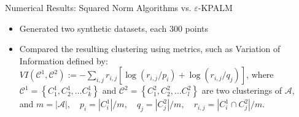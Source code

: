 \documentclass[9pt]{beamer}
\begin{document}
	\begin{frame}{Numerical Results: Squared Norm Algorithms vs. $\varepsilon$-KPALM}
		\begin{itemize}[<+->]
			\item Generated two synthetic datasets, each 300 points
			\begin{figure}
		    	\centering
			\end{figure}
			\setcounter{subfigure}{0}
			\item Compared the resulting clustering using metrics, such as {\dblue Variation of Information} defined by:
				$VI(\mathcal{C}^1,\mathcal{C}^2):=-\sum\limits_{i,j} r_{i,j}\left[ \log \left( r_{i,j}/p_i \right) + \log \left( r_{i,j}/q_j \right) \right]$, where $\mathcal{C}^1=\left\lbrace C^1_1, C^1_2, \ldots C^1_k \right\rbrace$ and $\mathcal{C}^2=\left\lbrace C^2_1, C^2_2, \ldots C^2_l \right\rbrace$ are two clusterings of $\mathcal{A}$,\\ and $m=|\mathcal{A}|, \quad p_i=|C^1_i|/m,\quad q_j=|C^2_j|/m, \quad r_{i,j}= |C^1_i \cap C^2_j|/m$.
		\end{itemize}
	\end{frame}
	
\end{document}
